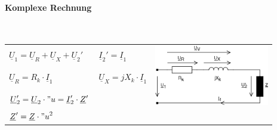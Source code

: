 		\paragraph{Komplexe Rechnung}$\;$\\
			\begin{tabular}{p{5cm}p{5cm}p{6cm}}
	            		$\boxed{\underline{U}_1 =
	            		\underline{U}_R+\underline{U}_X+\underline{U}_2'}$ & 
	            		$\boxed{\underline{I}_2' = \underline{I}_1}$ &
	            		\multirow{3}{*}{
	            		\parbox{6cm}{\includegraphics[width=5cm]{bilder/ErsatzschaltbildTrafoLast.png}}}
	            			            	\\		
	            		$\underline{U}_R=R_k \cdot \underline{I}_1$ &
	            		$\underline{U}_X=jX_k \cdot \underline{I}_1$ \\
	            		$\underline{U}_2'=\underline{U}_2 \cdot "u = \underline{I}_2' \cdot \underline{Z}'  $\\
	            		$\underline{Z}' = \underline{Z} \cdot {"u}^2$ \\
            \end{tabular}\\
		\renewcommand{\arraystretch}{1.0}

